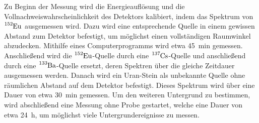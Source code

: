 Zu Beginn der Messung wird die Energieauflösung und die Vollnachweiswahrscheinlichkeit des Detektors kalibiert,
indem das Spektrum von $\ce{^{152}Eu}$ ausgemessen wird.
Dazu wird eine entsprechende Quelle in einem gewissen Abstand zum Detektor befestigt,
um möglichst einen vollständigen Raumwinkel abzudecken.
Mithilfe eines Computerprogramms wird etwa \SI{45}{\minute} gemessen.
Anschließend wird die $\ce{^{152}Eu}$-Quelle durch eine $\ce{^{137}Cs}$-Quelle und anschließend durch eine $\ce{^{133}Ba}$-Quelle ersetzt,
deren Spektren über die gleiche Zeitdauer ausgemessen werden.
Danach wird ein Uran-Stein als unbekannte Quelle ohne räumlichen Abstand auf dem Detektor befestigt.
Dieses Spektrum wird über eine Dauer von etwa \SI{30}{\minute} gemessen.
Um den weiteren Untergrund zu bestimmen,
wird abschließend eine Messung ohne Probe gestartet,
welche eine Dauer von etwa \SI{24}{\hour},
um möglichst viele Untergrundereignisse zu messen.